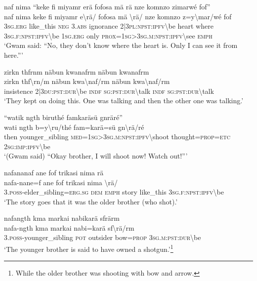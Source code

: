 \ea\label{ex:1:a3568}
naf nima ``keke fi miyamr erä fofosa mä rä nze komnzo zimarwé fof''\\
\gll naf	nima	keke	fi	miyamr	e{\textbackslash}rä/	fofosa	mä	{\textbackslash}rä/	nze	komnzo	z=y{\textbackslash}mar/wé	fof\\
     3\textsc{sg}.\textsc{erg}	like\_this	\textsc{neg}	3.\textsc{abs}	ignorance	2|3\textsc{pl}:\textsc{npst}:\textsc{ipfv}{\textbackslash}be	heart	where	3\textsc{sg}.\textsc{f}:\textsc{npst}:\textsc{ipfv}{\textbackslash}be	1\textsc{sg}.\textsc{erg}	only	\textsc{prox}=1\textsc{sg}>3\textsc{sg}.\textsc{m}:\textsc{npst}:\textsc{ipfv}{\textbackslash}see	\textsc{emph}\\
\glt `Gwam said: ``No, they don't know where the heart is. Only I can see it from here.'''
\z

\ea\label{ex:1:a3571}
zirkn thfrnm näbun kwanafrm näbun kwanafrm\\
\gll zirkn	thf{\textbackslash}rn/m	näbun	kwa{\textbackslash}naf/rm	näbun	kwa{\textbackslash}naf/rm\\
     insistence	2|3\textsc{du}:\textsc{pst}:\textsc{dur}{\textbackslash}be	\textsc{indf}	\textsc{sg}:\textsc{pst}:\textsc{dur}{\textbackslash}talk	\textsc{indf}	\textsc{sg}:\textsc{pst}:\textsc{dur}{\textbackslash}talk\\
\glt `They kept on doing this. One was talking and then the other one was talking.'
\z

\ea\label{ex:1:a3572}
``watik ngth biruthé famkaräsü gnräré''\\
\gll wati	ngth	b=y{\textbackslash}ru/thé	fam=karä=sü	gn{\textbackslash}rä/ré\\
     then	younger\_sibling	\textsc{med}=1\textsc{sg}>3\textsc{sg}.\textsc{m}:\textsc{npst}:\textsc{ipfv}{\textbackslash}shoot	thought=\textsc{prop}=\textsc{etc}	2\textsc{sg}:\textsc{imp}:\textsc{ipfv}{\textbackslash}be\\
\glt `(Gwam said) ``Okay brother, I will shoot now! Watch out!'''
\z

\ea\label{ex:1:a3574}
nafananaf ane fof trikasi nima rä\\
\gll nafa-nane=f	ane	fof	trikasi	nima	{\textbackslash}rä/\\
     3.\textsc{poss}-elder\_sibling=\textsc{erg}.\textsc{sg}	\textsc{dem}	\textsc{emph}	story	like\_this	3\textsc{sg}.\textsc{f}:\textsc{npst}:\textsc{ipfv}{\textbackslash}be\\
\glt `The story goes that it was the older brother (who shot).'
\z

\ea\label{ex:1:a3576}
nafangth kma markai nabikarä sfrärm\\
\gll nafa-ngth	kma	markai	nabi=karä	sf{\textbackslash}rä/rm\\
     3.\textsc{poss}-younger\_sibling	\textsc{pot}	outsider	bow=\textsc{prop}	3\textsc{sg}.\textsc{m}:\textsc{pst}:\textsc{dur}{\textbackslash}be\\
\glt `The younger brother is said to have owned a shotgun.'\footnote{While the older brother was shooting with bow and arrow.}
\z

